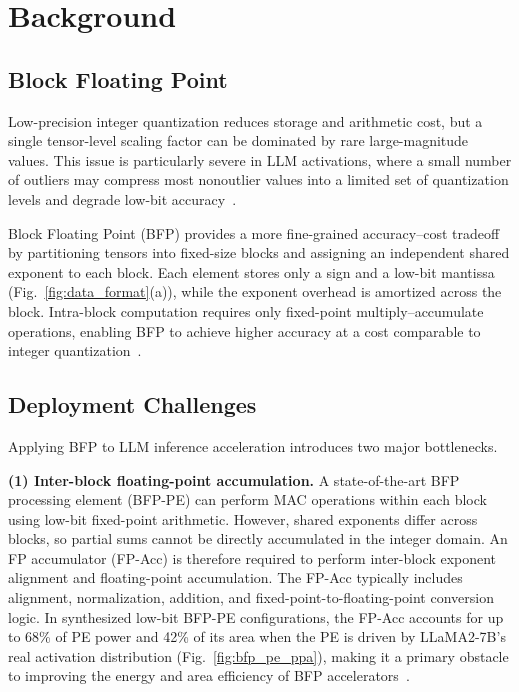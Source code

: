 \section{Background}
\label{sec:background}

\subsection{Block Floating Point}
Low-precision integer quantization reduces storage and arithmetic cost, but a single tensor-level scaling factor can be dominated by rare large-magnitude values.
This issue is particularly severe in LLM activations, where a small number of outliers may compress most nonoutlier values into a limited set of quantization levels and degrade low-bit accuracy~\cite{smoothquant2023,olive2023,gobo2020,billm2024}.

Block Floating Point (BFP) provides a more fine-grained accuracy--cost tradeoff by partitioning tensors into fixed-size blocks and assigning an independent shared exponent to each block.
Each element stores only a sign and a low-bit mantissa (Fig.~\ref{fig:data_format}(a)), while the exponent overhead is amortized across the block.
Intra-block computation requires only fixed-point multiply--accumulate operations, enabling BFP to achieve higher accuracy at a cost comparable to integer quantization~\cite{msfp2020,fast2022,anda2025}.

\subsection{Deployment Challenges}
Applying BFP to LLM inference acceleration introduces two major bottlenecks.

\textbf{(1) Inter-block floating-point accumulation.}
A state-of-the-art BFP processing element (BFP-PE) can perform MAC operations within each block using low-bit fixed-point arithmetic.
However, shared exponents differ across blocks, so partial sums cannot be directly accumulated in the integer domain.
An FP accumulator (FP-Acc) is therefore required to perform inter-block exponent alignment and floating-point accumulation.
The FP-Acc typically includes alignment, normalization, addition, and fixed-point-to-floating-point conversion logic.
In synthesized low-bit BFP-PE configurations, the FP-Acc accounts for up to 68\% of PE power and 42\% of its area when the PE is driven by LLaMA2-7B's real activation distribution (Fig.~\ref{fig:bfp_pe_ppa}), making it a primary obstacle to improving the energy and area efficiency of BFP accelerators~\cite{bucketgetter2023,winacc2025,smartblock2025}.

